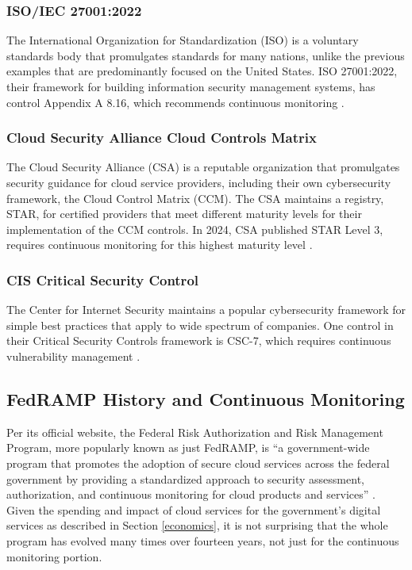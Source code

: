 \documentclass{jdf}
\begin{document}
\subsubsection{ISO/IEC 27001:2022}

The International Organization for Standardization (ISO) is a voluntary standards body that promulgates standards for many nations, unlike the previous examples that are predominantly focused on the United States. ISO 27001:2022, their framework for building information security management systems, has control Appendix A 8.16, which recommends continuous monitoring \citeyear{iso27001_22}.

\subsubsection{Cloud Security Alliance Cloud Controls Matrix}

The Cloud Security Alliance (CSA) is a reputable organization that promulgates security guidance for cloud service providers, including their own cybersecurity framework, the Cloud Control Matrix (CCM). The CSA maintains a registry, STAR, for certified providers that meet different maturity levels for their implementation of the CCM controls. In 2024, CSA published STAR Level 3, requires continuous monitoring for this highest maturity level \citeyear{csa_starl3_21}.

\subsubsection{CIS Critical Security Control}

The Center for Internet Security maintains a popular cybersecurity framework for simple best practices that apply to wide spectrum of companies. One control in their Critical Security Controls framework is CSC-7, which requires continuous vulnerability management \citeyear{csc18}.

\subsection{FedRAMP History and Continuous Monitoring}

Per its official website, the Federal Risk Authorization and Risk Management Program, more popularly known as just FedRAMP, is ``a government-wide program that promotes the adoption of secure cloud services across the federal government by providing a standardized approach to security assessment, authorization, and continuous monitoring for cloud products and services'' \citeyear{fedramp_definition25}. Given the spending and impact of cloud services for the government's digital services as described in Section \ref{economics}, it is not surprising that the whole program has evolved many times over fourteen years, not just for the continuous monitoring portion.
\end{document}
